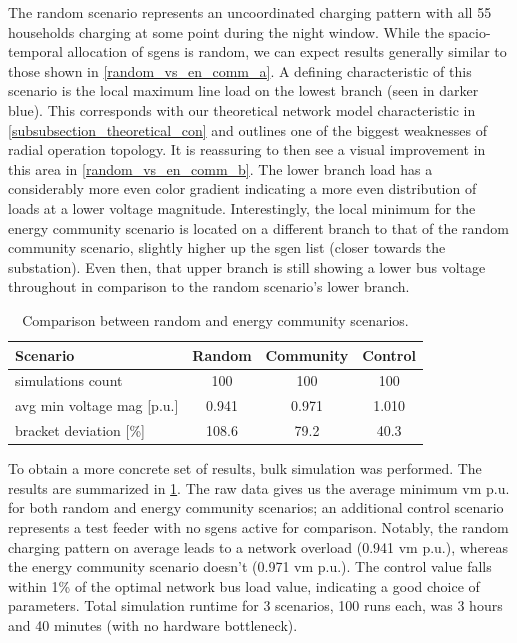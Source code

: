 \documentclass[a4paper,10pt]{report}
\begin{document}
The random scenario represents an uncoordinated charging pattern with all 55 households charging at some point during the night window. While the spacio-temporal allocation of sgens is random, we can expect results generally similar to those shown in \cref{random_vs_en_comm_a}. A defining characteristic of this scenario is the local maximum line load on the lowest branch (seen in darker blue). This corresponds with our theoretical network model characteristic in \cref{subsubsection_theoretical_con} and outlines one of the biggest weaknesses of radial operation topology. It is reassuring to then see a visual improvement in this area in \cref{random_vs_en_comm_b}. The lower branch load has a considerably more even color gradient indicating a more even distribution of loads at a lower voltage magnitude. Interestingly, the local minimum for the energy community scenario is located on a different branch to that of the random community scenario, slightly higher up the sgen list (closer towards the substation). Even then, that upper branch is still showing a lower bus voltage throughout in comparison to the random scenario's lower branch.

\begin{table}[htpb]
	\centering
	\begin{tabular}{lccc}
		\toprule
		Scenario & Random & Community & Control \\
		\midrule
		simulations count & 100 & 100 & 100 \\
		avg min voltage mag [p.u.] & 0.941 & 0.971 & 1.010 \\
		bracket deviation [\%] & 108.6 & 79.2 & 40.3 \\
		\bottomrule
	\end{tabular}
	\caption[Comparison between random and energy community scenarios]{Comparison between random and energy community scenarios.}
	\label{table_random_vs_comm}
\end{table}

To obtain a more concrete set of results, bulk simulation was performed. The results are summarized in \cref{table_random_vs_comm}. The raw data gives us the average minimum vm p.u. for both random and energy community scenarios; an additional control scenario represents a test feeder with no sgens active for comparison. Notably, the random charging pattern on average leads to a network overload (0.941 vm p.u.), whereas the energy community scenario doesn't (0.971 vm p.u.). The control value falls within 1\% of the optimal network bus load value, indicating a good choice of parameters. Total simulation runtime for 3 scenarios, 100 runs each, was 3 hours and 40 minutes (with no hardware bottleneck).
\end{document}
